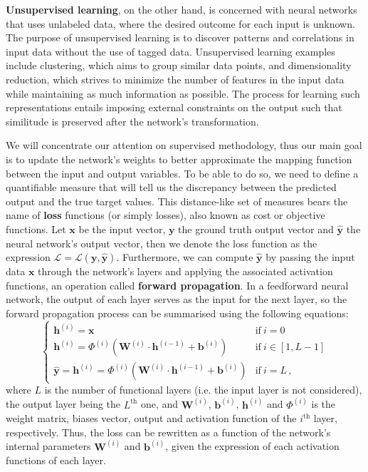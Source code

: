 \textbf{Unsupervised learning}, on the other hand, is concerned with neural networks that uses unlabeled data, where the desired outcome for each input is unknown. The purpose of unsupervised learning is to discover patterns and correlations in input data without the use of tagged data. Unsupervised learning examples include clustering, which aims to group similar data points, and dimensionality reduction, which strives to minimize the number of features in the input data while maintaining as much information as possible. The process for learning such representations entails imposing external constraints on the output such that similitude is preserved after the network's transformation.

We will concentrate our attention on supervised methodology, thus our main goal is to update the network's weights to better approximate the mapping function between the input and output variables. To be able to do so, we need to define a quantifiable measure that will tell us the discrepancy between the predicted output and the true target values. This distance-like set of measures bears the name of \textbf{loss} functions (or simply losses), also known as cost or objective functions. Let $\symbf{x}$ be the input vector, $\symbf{y}$ the ground truth output vector and $\symbf{\hat{y}}$ the neural network's output vector, then we denote the loss function as the expression $\mathcal{L} = \mathcal{L}\left( \symbf{y}, \symbf{\hat{y}} \right)$. Furthermore, we can compute $\symbf{\hat{y}}$ by passing the input data $\symbf{x}$ through the network's layers and applying the associated activation functions, an operation called \textbf{forward propagation}. In a feedforward neural network, the output of each layer serves as the input for the next layer, so the forward propagation process can be summarised using the following equations:
\begin{equation}
    \begin{cases}
        \symbf{h}^{(i)} = \symbf{x}                                                                     & \text{if} \ i = 0            \\
        \symbf{h}^{(i)} = \Phi^{(i)}(\symbf{W}^{(i)} \cdot\symbf{h}^{(i-1)} + \symbf{b}^{(i)})                & \text{if} \ i \in [1, L - 1] \\
        \symbf{\hat{y}} = \symbf{h}^{(i)} = \Phi^{(i)}(\symbf{W}^{(i)} \cdot\symbf{h}^{(i-1)} + \symbf{b}^{(i)}) & \text{if} \ i = L\,,
    \end{cases}
\end{equation}
\noindent where $L$ is the number of functional layers (i.e. the input layer is not considered), the output layer being the $L^\text{th}$ one, and $\symbf{W}^{(i)}$, $\symbf{b}^{(i)}$, $\symbf{h}^{(i)}$ and $\Phi^{(i)}$ is the weight matrix, biases vector, output and activation function of the $i^\text{th}$ layer, respectively. Thus, the loss can be rewritten as a function of the network's internal parameters $\symbf{W}^{(i)}$ and $\symbf{b}^{(i)}$, given the expression of each activation functions of each layer.

